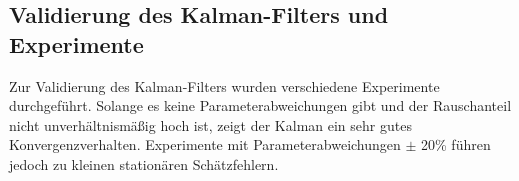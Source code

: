 \documentclass[times, 9pt,twocolumn]{article}
\begin{document}
	\subsection{Validierung des Kalman-Filters und Experimente}
	Zur Validierung des Kalman-Filters wurden verschiedene Experimente durchgeführt. Solange es keine Parameterabweichungen gibt und der Rauschanteil nicht unverhältnismäßig hoch ist, zeigt der Kalman ein sehr gutes Konvergenzverhalten. Experimente mit Parameterabweichungen $\pm$ 20\% führen jedoch zu kleinen stationären Schätzfehlern.
	

\nocite{ex3}
\end{document}
